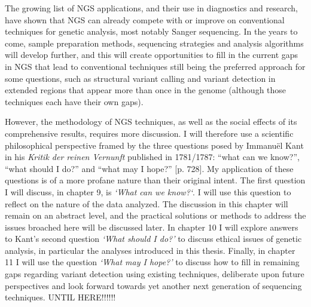 The growing list of NGS applications, and their use in diagnostics and research, have shown that NGS can already compete with or improve on conventional techniques for genetic analysis, most notably Sanger sequencing. 
In the years to come, sample preparation methods, sequencing strategies and analysis algorithms will develop further, and this will create opportunities to fill in the current gaps in NGS that lead to conventional techniques still being the preferred approach for some questions, such as structural variant calling and variant detection in extended regions that appear more than once in the genome (although those techniques each have their own gaps). 

However, the methodology of NGS techniques, as well as the social effects of its comprehensive results, requires more discussion. 
I will therefore use a scientific philosophical perspective framed by the three questions posed by Immanuël Kant in his \textsl{Kritik der reinen Vernunft} published in 1781/1787: “what can we know?”, “what should I do?” and “what may I hope?” \cite{Kant_1781a}[p. 728]. 
My application of these questions is of a more profane nature than their original intent. 
The first question I will discuss, in chapter 9, is \textsl{‘What can we know?‘}. 
I will use this question to reflect on the nature of the data analyzed. 
The discussion in this chapter will remain on an abstract level, and the practical solutions or methods to address the issues broached here will be discussed later. 
In chapter 10 I will explore answers to Kant’s second question \textsl{‘What should I do?’} to discuss ethical issues of genetic analysis, in particular the analyses introduced in this thesis. 
Finally, in chapter 11 I will use the question \textsl{‘What may I hope?’} to discuss how to fill in remaining gaps regarding variant detection using existing techniques, deliberate upon future perspectives and look forward towards yet another next generation of sequencing techniques.
UNTIL HERE!!!!!!

